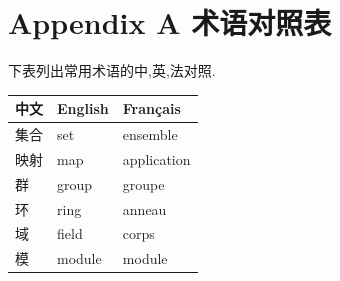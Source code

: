 \chapter*{Appendix A 术语对照表}

下表列出常用术语的中,英,法对照.

\begin{center}
\begin{tabular}{lll}
    中文 & English & Français \\
    \hline
    集合 & set & ensemble \\
    映射 & map & application \\
    群 & group & groupe \\
    环 & ring & anneau \\
    域 & field & corps \\
    模 & module & module \\
\end{tabular}
\end{center}
